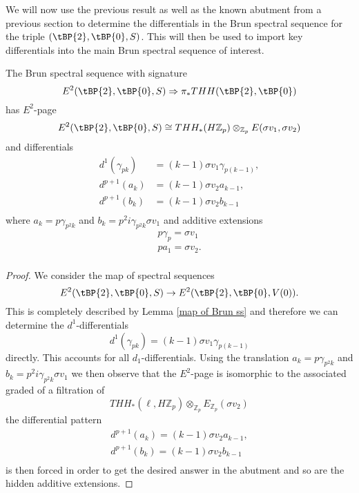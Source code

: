 We will now use the previous result as well as the known abutment from a previous section to determine the differentials in the Brun spectral sequence for the triple $(\tBP{2},\tBP{0},S)$. This will then be used to import key differentials into the main Brun spectral sequence of interest. 
\begin{lem}
The Brun spectral sequence with signature
\[ E^2(\tBP{2},\tBP{0},S)\Rightarrow \pi_*THH(\tBP{2},\tBP{0})\]
has $E^2$-page
\[ E^2(\tBP{2},\tBP{0},S)\cong THH_*(H\mathbb{Z}_p)\otimes_{\mathbb{Z}_p}E(\sigma v_1,\sigma v_2) \]
and differentials
\begin{align*}
	d^1(\gamma_{pk}) &= (k-1)\sigma v_1\gamma_{p(k-1)},\\
	d^{p+1}(a_k) &= (k-1)\sigma v_2a_{k-1}, \\ 
	 d^{p+1}(b_k)&=(k-1)\sigma v_2 b_{k-1}\\
\end{align*}
where $a_k=p\gamma_{p^2k}$ and $b_k=p^2i\gamma_{p^2k}\sigma v_1$ and additive extensions
\begin{align*}
p\gamma_p=\sigma v_1 \\
pa_1=\sigma v_2.\\
\end{align*}
\end{lem}
\begin{proof}
We consider the map of spectral sequences
\[ E^2(\tBP{2},\tBP{0},S)\to E^2(\tBP{2},\tBP{0},V(0)).\]
This is completely described by Lemma \ref{map of Brun ss} and therefore we can determine the $d^1$-differentials
\[d^1(\gamma_{pk}) = (k-1)\sigma v_1\gamma_{p(k-1)}\]
directly. This accounts for all $d_1$-differentials. Using the translation $a_k=p\gamma_{p^2k}$ and $b_k=p^2i\gamma_{p^2k}\sigma v_1$ we then observe that the $E^2$-page is isomorphic to the associated graded of a filtration of 
\[ THH_*(\ell, H\mathbb{Z}_p)\otimes_{\mathbb{Z}_p}E_{\mathbb{Z}_p}(\sigma v_2) \]
the differential pattern 
\begin{align*}
	d^{p+1}(a_k) = (k-1)\sigma v_2a_{k-1}, \\ 
	 d^{p+1}(b_k)=(k-1)\sigma v_2 b_{k-1}\\
\end{align*}
is then forced in order to get the desired answer in the abutment and so are the hidden additive extensions.
\end{proof}

